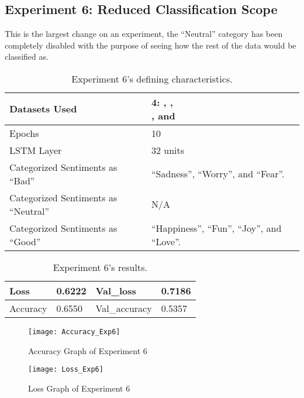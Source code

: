 \subsection{Experiment 6: Reduced Classification Scope}
\label{exp6}
This is the largest change on an experiment, the ``Neutral'' category has been completely disabled with the purpose of seeing how the rest of the data would be classified as.
\begin{table}[!h]
	\caption{Experiment 6's defining characteristics.}
	\vspace{0.5cm}
	\centering
	\begin{tabular}[t]{|l|l|}
	\hline
		Datasets Used & \makecell{4: \citet{d1}, \citet{d2},\\ \citet{d3}, and \citet{d4}}
	\\ \hline
		Epochs & 10
	\\ \hline
		LSTM Layer & 32 units
	\\ \hline
		Categorized Sentiments as ``Bad'' & ``Sadness'', ``Worry'', and ``Fear''.
	\\ \hline	
		 Categorized Sentiments as ``Neutral'' & N/A
	\\ \hline	
		Categorized Sentiments as ``Good'' & ``Happiness'', ``Fun'', ``Joy'', and ``Love''.
	\\ \hline
	\end{tabular}
\end{table}

\begin{table}[!b]
	\caption{Experiment 6's results.}
	\vspace{0.5cm}
	\centering
	\begin{tabular}[t]{|l|l|l|l|}
	\hline
		Loss & 0.6222 & Val\_loss & 0.7186
	\\ \hline
		Accuracy & 0.6550 & Val\_accuracy & 0.5357
	\\ \hline
	\end{tabular}
\end{table}


\begin{figure}[!h]
	\centering
	\texttt{[image: Accuracy\_Exp6]}
	\caption{Accuracy Graph of Experiment 6}
	\label{fig:accuracy_exp6}
	\texttt{[image: Loss\_Exp6]}
	\caption{Loss Graph of Experiment 6}
	\label{fig:loss_exp6}
\end{figure}
\pagebreak

